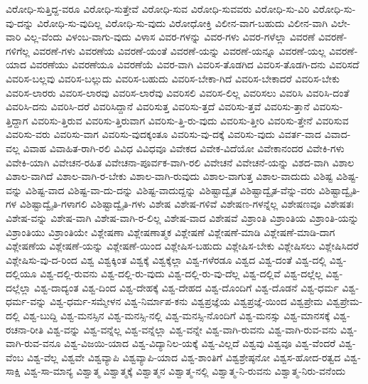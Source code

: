 {ವಿರೋಧಿ-ಸುತ್ತಿದ್ದ-ವರೂ
ವಿರೋಧಿ-ಸುತ್ತೇವೆ
ವಿರೋಧಿ-ಸುವ
ವಿರೋಧಿ-ಸುವವರು
ವಿರೋಧಿ-ಸು-ವಿರಿ
ವಿರೋಧಿ-ಸು-ವು-ದನ್ನು
ವಿರೋಧಿ-ಸು-ವುದಿಲ್ಲ
ವಿರೋಧಿ-ಸು-ವುದು
ವಿರೋಧೋಕ್ತಿ
ವಿಲೀನ-ವಾಗ-ಬಹುದು
ವಿಲೀನ-ವಾಗಿ
ವಿಲೇ-ವಾರಿ
ವಿಲ್ಲ-ವೆಂದು
ವಿಳಂಬ-ವಾಗು-ವುದು
ವಿಳಾಸ
ವಿವರ-ಗಳನ್ನು
ವಿವರ-ಗಳು
ವಿವರ-ಗಳೆಲ್ಲಾ
ವಿವರಣೆ
ವಿವರಣೆ-ಗಳಿಗೆಲ್ಲ
ವಿವರಣೆ-ಗಳು
ವಿವರಣೆಯ
ವಿವರಣೆ-ಯಂತೆ
ವಿವರಣೆ-ಯನ್ನು
ವಿವರಣೆ-ಯನ್ನೂ
ವಿವರಣೆ-ಯಲ್ಲ
ವಿವರಣೆ-ಯಾದ
ವಿವರಣೆಯು
ವಿವರಣೆಯೂ
ವಿವರಣೆಯೆ
ವಿವರ-ವಾಗಿ
ವಿವರಿಸ-ತೊಡಗಿದ
ವಿವರಿಸ-ತೊಡಗಿ-ದನು
ವಿವರಿಸದೆ
ವಿವರಿಸ-ಬಲ್ಲವು
ವಿವರಿಸ-ಬಲ್ಲುದು
ವಿವರಿಸ-ಬಹುದು
ವಿವರಿಸ-ಬೇಕಾ-ಗಿದೆ
ವಿವರಿಸ-ಬೇಕಾದರೆ
ವಿವರಿಸ-ಬೇಕು
ವಿವರಿಸ-ಲಾರರು
ವಿವರಿಸ-ಲಾರವು
ವಿವರಿಸ-ಲಾರೆವು
ವಿವರಿಸಲಿ
ವಿವರಿಸ-ಲಿಲ್ಲ
ವಿವರಿಸಲು
ವಿವರಿಸಿ
ವಿವರಿಸಿ-ದಂತೆ
ವಿವರಿಸಿ-ದನು
ವಿವರಿಸಿ-ದರೆ
ವಿವರಿಸಿದ್ದಾನೆ
ವಿವರಿಸುತ್ತ
ವಿವರಿಸು-ತ್ತದೆ
ವಿವರಿಸು-ತ್ತವೆ
ವಿವರಿಸು-ತ್ತಾನೆ
ವಿವರಿಸು-ತ್ತಿದ್ದಾಗ
ವಿವರಿಸು-ತ್ತಿರುವ
ವಿವರಿಸು-ತ್ತಿರುವಾಗ
ವಿವರಿಸು-ತ್ತಿ-ರು-ವುದು
ವಿವರಿಸು-ತ್ತೀರಿ
ವಿವರಿಸು-ತ್ತೇನೆ
ವಿವರಿಸುವ
ವಿವರಿಸು-ವರು
ವಿವರಿಸು-ವಾಗ
ವಿವರಿಸು-ವುದಕ್ಕಂತೂ
ವಿವರಿಸು-ವು-ದಕ್ಕೆ
ವಿವರಿಸು-ವುದು
ವಿವರ್ತ-ವಾದ
ವಿವಾದ-ವಲ್ಲ
ವಿವಾಹ
ವಿವಾಹಿತ-ರಾಗಿ-ರಲಿ
ವಿವಿಧ
ವಿವಿಧವೂ
ವಿವೇಕದ
ವಿವೇಕ-ವಿದೆಯೋ
ವಿವೇಕಾನಂದರ
ವಿವೇಕಿ-ಗಳು
ವಿವೇಕಿ-ಯಾಗಿ
ವಿವೇಚನ-ರಹಿತ
ವಿವೇಚನಾ-ಪೂರ್ವಕ-ವಾಗಿ-ರಲಿ
ವಿವೇಚನೆ
ವಿವೇಚನೆ-ಯನ್ನು
ವಿಶದ-ವಾಗಿ
ವಿಶಾಲ
ವಿಶಾಲ-ವಾಗಿದೆ
ವಿಶಾಲ-ವಾಗಿ-ರ-ಬೇಕು
ವಿಶಾಲ-ವಾಗಿ-ರುವುದು
ವಿಶಾಲ-ವಾಗುತ್ತ
ವಿಶಾಲ-ವಾದುದು
ವಿಶಿಷ್ಟ
ವಿಶಿಷ್ಟ-ವನ್ನು
ವಿಶಿಷ್ಟ-ವಾದ
ವಿಶಿಷ್ಟ-ವಾ-ದು-ದನ್ನು
ವಿಶಿಷ್ಟ-ವಾದುದ್ದನ್ನು
ವಿಶಿಷ್ಟಾದ್ವೈತ
ವಿಶಿಷ್ಟಾದ್ವೈತ-ವೆನ್ನು-ವರು
ವಿಶಿಷ್ಟಾದ್ವೈತಿ-ಗಳ
ವಿಶಿಷ್ಟಾದ್ವೈತಿ-ಗಳಾಗಲಿ
ವಿಶಿಷ್ಟಾದ್ವೈತಿ-ಗಳು
ವಿಶೇಷ
ವಿಶೇಷ-ಗಳಿವೆ
ವಿಶೇಷಣ-ಗಳನ್ನೆಲ್ಲ
ವಿಶೇಷಣವೂ
ವಿಶೇಷತಃ
ವಿಶೇಷ-ವನ್ನು
ವಿಶೇಷ-ವಾಗಿ
ವಿಶೇಷ-ವಾಗಿ-ರ-ಲಿಲ್ಲ
ವಿಶೇಷ-ವಾದ
ವಿಶೇಷವೆ
ವಿಶ್ರಾಂತಿ
ವಿಶ್ರಾಂತಿಯ
ವಿಶ್ರಾಂತಿ-ಯನ್ನು
ವಿಶ್ರಾಂತಿಯು
ವಿಶ್ರಾಂತಿಯೇ
ವಿಶ್ಲೇಷಣಾ
ವಿಶ್ಲೇಷಣಾತ್ಮಕ
ವಿಶ್ಲೇಷಣೆ
ವಿಶ್ಲೇಷಣೆ-ಮಾಡಿ
ವಿಶ್ಲೇಷಣೆ-ಮಾಡಿ-ದಾಗ
ವಿಶ್ಲೇಷಣೆಯ
ವಿಶ್ಲೇಷಣೆ-ಯನ್ನು
ವಿಶ್ಲೇಷಣೆ-ಯಿಂದ
ವಿಶ್ಲೇಷಿಸ-ಬಹುದು
ವಿಶ್ಲೇಷಿಸ-ಬೇಕು
ವಿಶ್ಲೇಷಿಸಲು
ವಿಶ್ಲೇಷಿಸಿದರೆ
ವಿಶ್ಲೇಷಿಸು-ವು-ದ-ರಿಂದ
ವಿಶ್ವ
ವಿಶ್ವಕ್ಕಿಂತ
ವಿಶ್ವಕ್ಕೆ
ವಿಶ್ವಕ್ಕೆಲ್ಲಾ
ವಿಶ್ವ-ಗಳೆರಡೂ
ವಿಶ್ವದ
ವಿಶ್ವ-ದಂತೆ
ವಿಶ್ವ-ದಲ್ಲಿ
ವಿಶ್ವ-ದಲ್ಲಿಯೂ
ವಿಶ್ವ-ದಲ್ಲಿ-ರುವನು
ವಿಶ್ವ-ದಲ್ಲಿ-ರು-ವುದು
ವಿಶ್ವ-ದಲ್ಲಿ-ರು-ವು-ದೆಲ್ಲ
ವಿಶ್ವ-ದಲ್ಲಿವೆ
ವಿಶ್ವ-ದಲ್ಲೆಲ್ಲ
ವಿಶ್ವ-ದಲ್ಲೆಲ್ಲಾ
ವಿಶ್ವ-ದಾದ್ಯಂತ
ವಿಶ್ವ-ದಿಂದ
ವಿಶ್ವ-ದೇಹಕ್ಕೆ
ವಿಶ್ವ-ದೇಹದ
ವಿಶ್ವ-ದೊಂದಿಗೆ
ವಿಶ್ವ-ದೊಡನೆ
ವಿಶ್ವ-ಧರ್ಮ
ವಿಶ್ವ-ಧರ್ಮ-ವನ್ನು
ವಿಶ್ವ-ಧರ್ಮ-ಸಮ್ಮೇಳನ
ವಿಶ್ವ-ನಿರ್ಮಾಪ-ಕನು
ವಿಶ್ವಪ್ರಜ್ಞೆಯ
ವಿಶ್ವಪ್ರಜ್ಞೆ-ಯಿಂದ
ವಿಶ್ವಪ್ರೇಮ
ವಿಶ್ವಪ್ರೇಮ-ದಲ್ಲಿ
ವಿಶ್ವ-ಬುದ್ದಿ
ವಿಶ್ವ-ಮನಸ್ಸಿನ
ವಿಶ್ವ-ಮನಸ್ಸಿ-ನಲ್ಲಿ
ವಿಶ್ವ-ಮನಸ್ಸಿ-ನೊಂದಿಗೆ
ವಿಶ್ವ-ಮನಸ್ಸು
ವಿಶ್ವ-ಮಾನಸಕ್ಕೆ
ವಿಶ್ವ-ರಚನಾ-ರೀತಿ
ವಿಶ್ವ-ವನ್ನು
ವಿಶ್ವ-ವನ್ನೆಲ್ಲ
ವಿಶ್ವ-ವನ್ನೆಲ್ಲಾ
ವಿಶ್ವ-ವನ್ನೇ
ವಿಶ್ವ-ವಾಗಿ-ರುವನು
ವಿಶ್ವ-ವಾಗಿ-ರುವ-ವನು
ವಿಶ್ವ-ವಾಗಿ-ರುವ-ವನೂ
ವಿಶ್ವ-ವಿಜಯಿ-ಯಾದ
ವಿಶ್ವ-ವಿದ್ಯಾನಿಲ-ಯಕ್ಕೆ
ವಿಶ್ವ-ವಿಲ್ಲದೆ
ವಿಶ್ವವು
ವಿಶ್ವವೂ
ವಿಶ್ವ-ವೆಂದರೆ
ವಿಶ್ವ-ವೆಂಬ
ವಿಶ್ವ-ವೆಲ್ಲ
ವಿಶ್ವವೇ
ವಿಶ್ವವ್ಯಾಪಿ
ವಿಶ್ವವ್ಯಾಪಿ-ಯಾದ
ವಿಶ್ವ-ಶಾಂತಿಗೆ
ವಿಶ್ವಶ್ರೇಷ್ಠನೋ
ವಿಶ್ವಸ-ಹೋದ-ರತ್ವದ
ವಿಶ್ವ-ಸಾಕ್ಷಿ
ವಿಶ್ವ-ಸಾ-ಮಾನ್ಯ
ವಿಶ್ವಾತ್ಮ
ವಿಶ್ವಾತ್ಮಕ್ಕೆ
ವಿಶ್ವಾತ್ಮನ
ವಿಶ್ವಾತ್ಮ-ನಲ್ಲಿ
ವಿಶ್ವಾತ್ಮ-ನಿ-ರುವನು
ವಿಶ್ವಾತ್ಮ-ನಿರು-ವನೆಂದು
}
